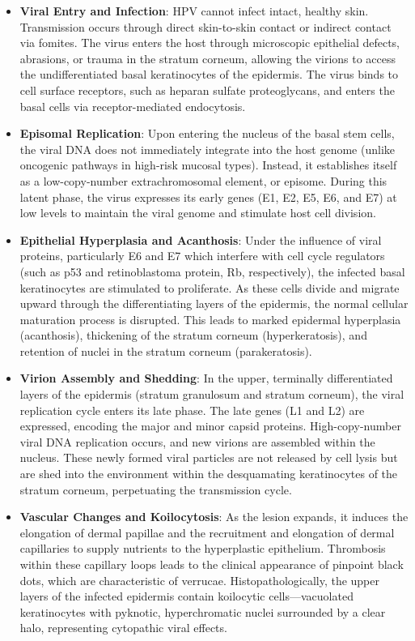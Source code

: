 \begin{itemize}
    \item \textbf{Viral Entry and Infection}: HPV cannot infect intact, healthy skin. Transmission occurs through direct skin-to-skin contact or indirect contact via fomites. The virus enters the host through microscopic epithelial defects, abrasions, or trauma in the stratum corneum, allowing the virions to access the undifferentiated basal keratinocytes of the epidermis. The virus binds to cell surface receptors, such as heparan sulfate proteoglycans, and enters the basal cells via receptor-mediated endocytosis.
    \item \textbf{Episomal Replication}: Upon entering the nucleus of the basal stem cells, the viral DNA does not immediately integrate into the host genome (unlike oncogenic pathways in high-risk mucosal types). Instead, it establishes itself as a low-copy-number extrachromosomal element, or episome. During this latent phase, the virus expresses its early genes (E1, E2, E5, E6, and E7) at low levels to maintain the viral genome and stimulate host cell division.
    \item \textbf{Epithelial Hyperplasia and Acanthosis}: Under the influence of viral proteins, particularly E6 and E7 which interfere with cell cycle regulators (such as p53 and retinoblastoma protein, Rb, respectively), the infected basal keratinocytes are stimulated to proliferate. As these cells divide and migrate upward through the differentiating layers of the epidermis, the normal cellular maturation process is disrupted. This leads to marked epidermal hyperplasia (acanthosis), thickening of the stratum corneum (hyperkeratosis), and retention of nuclei in the stratum corneum (parakeratosis).
    \item \textbf{Virion Assembly and Shedding}: In the upper, terminally differentiated layers of the epidermis (stratum granulosum and stratum corneum), the viral replication cycle enters its late phase. The late genes (L1 and L2) are expressed, encoding the major and minor capsid proteins. High-copy-number viral DNA replication occurs, and new virions are assembled within the nucleus. These newly formed viral particles are not released by cell lysis but are shed into the environment within the desquamating keratinocytes of the stratum corneum, perpetuating the transmission cycle.
    \item \textbf{Vascular Changes and Koilocytosis}: As the lesion expands, it induces the elongation of dermal papillae and the recruitment and elongation of dermal capillaries to supply nutrients to the hyperplastic epithelium. Thrombosis within these capillary loops leads to the clinical appearance of pinpoint black dots, which are characteristic of verrucae. Histopathologically, the upper layers of the infected epidermis contain koilocytic cells---vacuolated keratinocytes with pyknotic, hyperchromatic nuclei surrounded by a clear halo, representing cytopathic viral effects.
\end{itemize}

